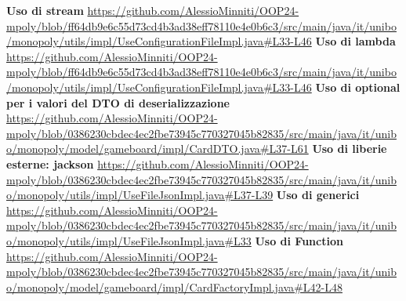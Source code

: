 \textbf{Uso di stream}\newline
\url{https://github.com/AlessioMinniti/OOP24-mpoly/blob/ff64db9e6c55d73cd4b3ad38eff78110e4e0b6c3/src/main/java/it/unibo/monopoly/utils/impl/UseConfigurationFileImpl.java#L33-L46}\newline
\textbf{Uso di lambda}\newline
\url{https://github.com/AlessioMinniti/OOP24-mpoly/blob/ff64db9e6c55d73cd4b3ad38eff78110e4e0b6c3/src/main/java/it/unibo/monopoly/utils/impl/UseConfigurationFileImpl.java#L33-L46}\newline
\textbf{Uso di optional per i valori del DTO di deserializzazione}\newline
\url{https://github.com/AlessioMinniti/OOP24-mpoly/blob/0386230cbdec4ec2fbe73945c770327045b82835/src/main/java/it/unibo/monopoly/model/gameboard/impl/CardDTO.java#L37-L61}\newline
\textbf{Uso di liberie esterne: jackson}\newline
\url{https://github.com/AlessioMinniti/OOP24-mpoly/blob/0386230cbdec4ec2fbe73945c770327045b82835/src/main/java/it/unibo/monopoly/utils/impl/UseFileJsonImpl.java#L37-L39}\newline
\textbf{Uso di generici}\newline
\url{https://github.com/AlessioMinniti/OOP24-mpoly/blob/0386230cbdec4ec2fbe73945c770327045b82835/src/main/java/it/unibo/monopoly/utils/impl/UseFileJsonImpl.java#L33}\newline
\textbf{Uso di Function}\newline
\url{https://github.com/AlessioMinniti/OOP24-mpoly/blob/0386230cbdec4ec2fbe73945c770327045b82835/src/main/java/it/unibo/monopoly/model/gameboard/impl/CardFactoryImpl.java#L42-L48}\newline